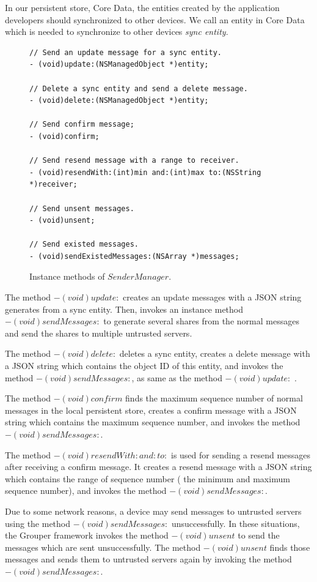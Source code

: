 \documentclass[a4paper,11pt]{report}
\begin{document}
In our persistent store, Core Data\cite{coredata}, the entities created by the application developers should synchronized to other devices.
We call an entity in Core Data which is needed to synchronize to other devices \emph{sync entity}.

\begin{figure}
\begin{lstlisting}[frame=none language=Objective-C] 
// Send an update message for a sync entity.
- (void)update:(NSManagedObject *)entity;

// Delete a sync entity and send a delete message.
- (void)delete:(NSManagedObject *)entity;

// Send confirm message;
- (void)confirm;

// Send resend message with a range to receiver.
- (void)resendWith:(int)min and:(int)max to:(NSString *)receiver;

// Send unsent messages.
- (void)unsent;

// Send existed messages.
- (void)sendExistedMessages:(NSArray *)messages;	
\end{lstlisting}
\caption{Instance methods of $SenderManager$.}
\label{fig:sender_manager}
\end{figure}

The method $- (void)update:$ creates an update messages with a JSON string generates from a sync entity. Then, invokes an instance method $- (void)sendMessages:$ to generate several shares from the normal messages and send the shares to multiple untrusted servers.

The method $- (void)delete:$ deletes a sync entity, creates a delete message with a JSON string which contains the object ID of this entity, and invokes the method $- (void)sendMessages:$, as same as the method $- (void)update:$ .

The method $- (void)confirm$ finds the maximum sequence number of normal messages in the local persistent store, creates a confirm message with a JSON string which contains the maximum sequence number, and invokes the method $- (void)sendMessages:$.

The method $- (void)resendWith:and:to:$ is used for sending a resend messages after receiving a confirm message.
It creates a resend message with a JSON string which contains the range of sequence number ( the minimum and maximum sequence number), and invokes the method $- (void)sendMessages:$.

Due to some network reasons, a device may send messages to untrusted servers using the method $- (void)sendMessages:$ unsuccessfully.
In these situations, the Grouper framework invokes the method $- (void)unsent$ to send the messages which are sent unsuccessfully.
The method $- (void)unsent$ finds those messages and sends them to untrusted servers again by invoking the method $- (void)sendMessages:$.
\end{document}

